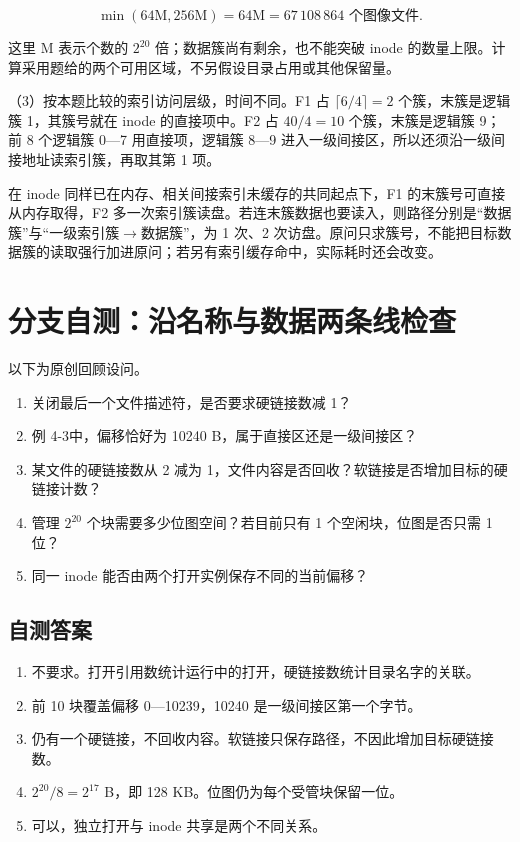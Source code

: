 \[\min(64\mathrm{M},256\mathrm{M})=64\mathrm{M}=67\,108\,864\text{ 个图像文件}.\]

这里 M 表示个数的 \(2^{20}\) 倍；数据簇尚有剩余，也不能突破 inode 的数量上限。计算采用题给的两个可用区域，不另假设目录占用或其他保留量。

（3）按本题比较的索引访问层级，时间不同。F1 占 \(\lceil6/4\rceil=2\) 个簇，末簇是逻辑簇 1，其簇号就在 inode 的直接项中。F2 占 \(40/4=10\) 个簇，末簇是逻辑簇 9；前 8 个逻辑簇 0---7 用直接项，逻辑簇 8---9 进入一级间接区，所以还须沿一级间接地址读索引簇，再取其第 1 项。

在 inode 同样已在内存、相关间接索引未缓存的共同起点下，F1 的末簇号可直接从内存取得，F2 多一次索引簇读盘。若连末簇数据也要读入，则路径分别是“数据簇”与“一级索引簇\ensuremath{\to}数据簇”，为 1 次、2 次访盘。原问只求簇号，不能把目标数据簇的读取强行加进原问；若另有索引缓存命中，实际耗时还会改变。

\section{分支自测：沿名称与数据两条线检查}\label{OS04-6-review}

以下为原创回顾设问。

\begin{enumerate}
\def\labelenumi{\arabic{enumi}.}
\tightlist
\item
  关闭最后一个文件描述符，是否要求硬链接数减 1？
\item
  例 4-3中，偏移恰好为 10240 B，属于直接区还是一级间接区？
\item
  某文件的硬链接数从 2 减为 1，文件内容是否回收？软链接是否增加目标的硬链接计数？
\item
  管理 \(2^{20}\) 个块需要多少位图空间？若目前只有 1 个空闲块，位图是否只需 1 位？
\item
  同一 inode 能否由两个打开实例保存不同的当前偏移？
\end{enumerate}

\subsection{自测答案}\label{OS04-auto-2}

\begin{enumerate}
\def\labelenumi{\arabic{enumi}.}
\tightlist
\item
  不要求。打开引用数统计运行中的打开，硬链接数统计目录名字的关联。
\item
  前 10 块覆盖偏移 0---10239，10240 是一级间接区第一个字节。
\item
  仍有一个硬链接，不回收内容。软链接只保存路径，不因此增加目标硬链接数。
\item
  \(2^{20}/8=2^{17}\) B，即 128 KB。位图仍为每个受管块保留一位。
\item
  可以，独立打开与 inode 共享是两个不同关系。
\end{enumerate}

